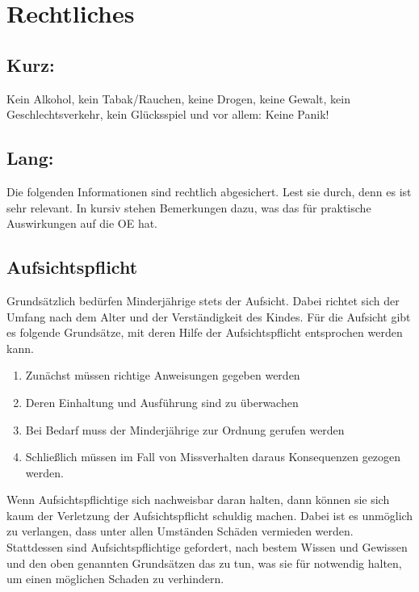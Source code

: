 \documentclass[a4paper,11pt]{scrartcl} %
\begin{document}
\section{Rechtliches}		
		
	\subsection*{Kurz:}

Kein Alkohol, kein Tabak/Rauchen, keine Drogen, keine Gewalt, kein Geschlechtsverkehr, kein Glücksspiel und vor allem: Keine Panik!

		\subsection*{Lang:}
		
Die folgenden Informationen sind rechtlich abgesichert. Lest sie durch, denn es ist sehr relevant. In kursiv stehen Bemerkungen dazu, was das für praktische Auswirkungen auf die OE hat.

\subsection{Aufsichtspflicht}

Grundsätzlich bedürfen Minderjährige stets der Aufsicht. Dabei richtet sich der Umfang nach dem Alter und der Verständigkeit des Kindes. Für die Aufsicht gibt es folgende Grundsätze, mit deren Hilfe der Aufsichtspflicht entsprochen werden kann.

\begin{enumerate}
	\item Zunächst müssen richtige Anweisungen gegeben werden
	\item Deren Einhaltung und Ausführung sind zu überwachen
	\item Bei Bedarf muss der Minderjährige zur Ordnung gerufen werden
	\item Schließlich müssen im Fall von Missverhalten daraus Konsequenzen gezogen werden.
\end{enumerate}

Wenn Aufsichtspflichtige sich nachweisbar daran halten, dann können sie sich kaum der Verletzung der Aufsichtspflicht schuldig machen. Dabei ist es unmöglich zu verlangen, dass unter allen Umständen Schäden vermieden werden. Stattdessen sind Aufsichtspflichtige gefordert, nach bestem Wissen und Gewissen und den oben genannten Grundsätzen das zu tun, was sie für notwendig halten, um einen möglichen Schaden zu verhindern.
\end{document}
